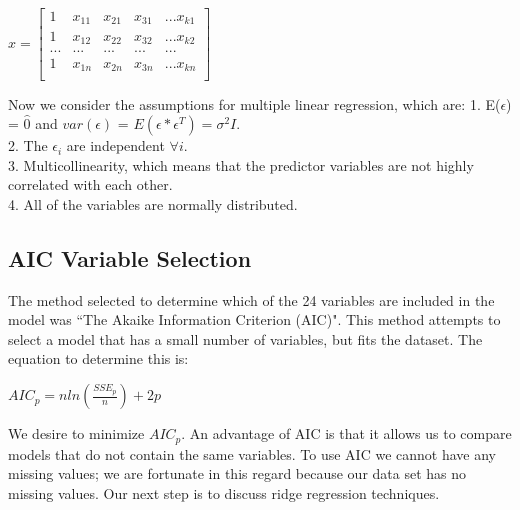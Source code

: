 \begin{center}$
x = \begin{bmatrix}
	1 & x_{11} & x_{21} & x_{31} & ... x_{k1} \\
	1 & x_{12} & x_{22} & x_{32} & ... x_{k2} \\
	... & ... & ... & ... & ... \\
	1 & x_{1n} & x_{2n} & x_{3n} & ... x_{kn} \\
\end{bmatrix}
$\end{center}
Now we consider the assumptions for multiple linear regression, which are:
1. E($\epsilon$) = $\hat{0}$ and $var(\epsilon)$ = $E(\epsilon * \epsilon^T) = \sigma^2 I$. \\
2. The $\epsilon_i$ are independent $\forall i$. \\
3. Multicollinearity, which means that the predictor variables are not highly correlated with each other. \\
4. All of the variables are normally distributed.
\subsection*{AIC Variable Selection}
The method selected to determine which of the 24 variables are included in the model was ``The Akaike Information Criterion (AIC)"\cite{Samprit}. This method attempts to select a model that has a small number of variables, but fits the dataset. The equation to determine this is: \begin{center}$
AIC_p = nln(\frac{SSE_p}{n}) + 2p	
$\end{center} We desire to minimize $AIC_p$. An advantage of AIC is that it allows us to compare models that do not contain the same variables. To use AIC we cannot have any missing values; we are fortunate in this regard because our data set has no missing values. Our next step is to discuss ridge regression techniques.  

